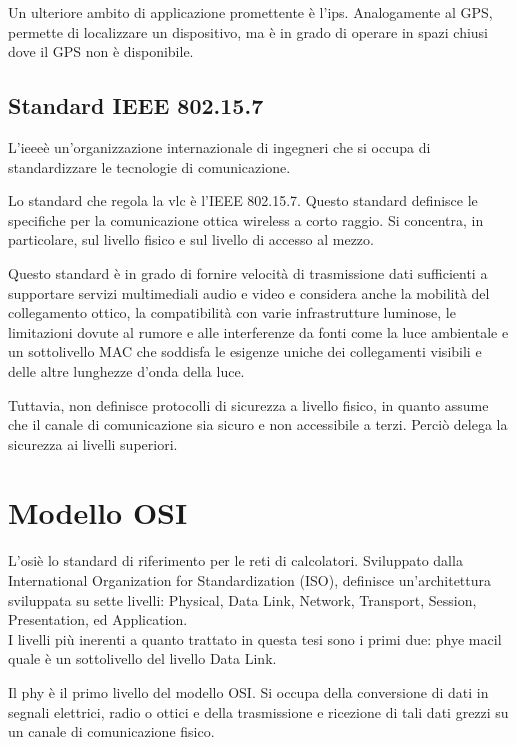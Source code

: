 Un ulteriore ambito di applicazione promettente è l'\gls{ips}\glsfirstoccur. Analogamente al GPS, permette di localizzare un dispositivo, ma è in grado di operare in spazi chiusi dove il GPS non è disponibile.

\subsection{Standard IEEE 802.15.7}
L'\gls{ieee}\glsfirstoccur è un'organizzazione internazionale di ingegneri che si occupa di standardizzare le tecnologie di comunicazione.

Lo standard che regola la \gls{vlc} è l'IEEE 802.15.7. Questo standard definisce le specifiche per la comunicazione ottica wireless a corto raggio. Si concentra, in particolare, sul livello fisico e sul livello di accesso al mezzo.

Questo standard è in grado di fornire velocità di trasmissione dati sufficienti a supportare servizi multimediali audio e video e considera anche la mobilità del collegamento ottico, la compatibilità con varie infrastrutture luminose, le limitazioni dovute al rumore e alle interferenze da fonti come la luce ambientale e un sottolivello MAC che soddisfa le esigenze uniche dei collegamenti visibili e delle altre lunghezze d'onda della luce.

Tuttavia, non definisce protocolli di sicurezza a livello fisico, in quanto assume che il canale di comunicazione sia sicuro e non accessibile a terzi. Perciò delega la sicurezza ai livelli superiori.

\section{Modello OSI}

L'\gls{osi}\glsfirstoccur è lo standard di riferimento per le reti di calcolatori. Sviluppato dalla International Organization for Standardization (ISO), definisce un'architettura sviluppata su sette livelli: Physical, Data Link, Network, Transport, Session, Presentation, ed Application.\\
I livelli più inerenti a quanto trattato in questa tesi sono i primi due: \gls{phy}\glsfirstoccur e \gls{mac}\glsfirstoccur il quale è un sottolivello del livello Data Link.

Il \gls{phy} è il primo livello del modello OSI. Si occupa della conversione di dati in segnali elettrici, radio o ottici e della trasmissione e ricezione di tali dati grezzi su un canale di comunicazione fisico.


